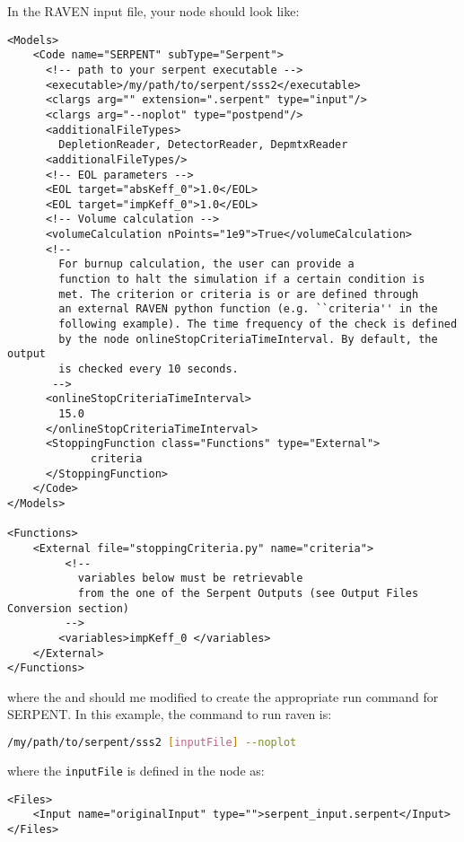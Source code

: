 In the RAVEN input file, your  node should look like:
\begin{lstlisting}[style=XML]
<Models>
    <Code name="SERPENT" subType="Serpent">
      <!-- path to your serpent executable -->
      <executable>/my/path/to/serpent/sss2</executable>
      <clargs arg="" extension=".serpent" type="input"/>
      <clargs arg="--noplot" type="postpend"/>
      <additionalFileTypes>
        DepletionReader, DetectorReader, DepmtxReader
      <additionalFileTypes/>
      <!-- EOL parameters -->
      <EOL target="absKeff_0">1.0</EOL>
      <EOL target="impKeff_0">1.0</EOL>
      <!-- Volume calculation -->
      <volumeCalculation nPoints="1e9">True</volumeCalculation>
      <!--
        For burnup calculation, the user can provide a
        function to halt the simulation if a certain condition is
        met. The criterion or criteria is or are defined through
        an external RAVEN python function (e.g. ``criteria'' in the
        following example). The time frequency of the check is defined
        by the node onlineStopCriteriaTimeInterval. By default, the output
        is checked every 10 seconds.
       -->
      <onlineStopCriteriaTimeInterval>
        15.0
      </onlineStopCriteriaTimeInterval>
      <StoppingFunction class="Functions" type="External">
             criteria
      </StoppingFunction>
    </Code>
</Models>

<Functions>
    <External file="stoppingCriteria.py" name="criteria">
         <!-- 
           variables below must be retrievable
           from the one of the Serpent Outputs (see Output Files Conversion section)
         -->
        <variables>impKeff_0 </variables>
    </External>
</Functions>
\end{lstlisting}
where the  and  should me modified
to create the appropriate run command for SERPENT. In this example, the command
to run raven is:
\begin{lstlisting}[language=bash]
/my/path/to/serpent/sss2 [inputFile] --noplot
\end{lstlisting}
where the \texttt{inputFile} is defined in the  node as:
\begin{lstlisting}[style=XML]
<Files>
    <Input name="originalInput" type="">serpent_input.serpent</Input>
</Files>
\end{lstlisting}

